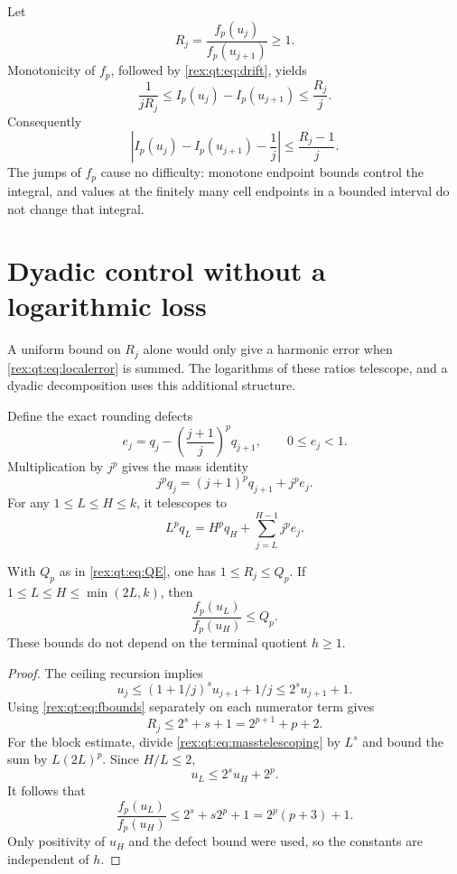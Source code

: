 Let
\begin{equation}\label{rex:qt:eq:R}
 R_j=\frac{f_p(u_j)}{f_p(u_{j+1})}\ge1.
\end{equation}
Monotonicity of $f_p$, followed by \eqref{rex:qt:eq:drift}, yields
\[
 \frac1{jR_j}\le I_p(u_j)-I_p(u_{j+1})\le\frac{R_j}{j}.
\]
Consequently
\begin{equation}\label{rex:qt:eq:localerror}
 \left|I_p(u_j)-I_p(u_{j+1})-\frac1j\right|
 \le\frac{R_j-1}{j}.
\end{equation}
The jumps of $f_p$ cause no difficulty: monotone endpoint bounds control the integral, and values at the finitely many cell endpoints in a bounded interval do not change that integral.

\section{Dyadic control without a logarithmic loss}\label{rex:qt:sec:dyadic}
A uniform bound on $R_j$ alone would only give a harmonic error when \eqref{rex:qt:eq:localerror} is summed. The logarithms of these ratios telescope, and a dyadic decomposition uses this additional structure.

Define the exact rounding defects
\begin{equation}\label{rex:qt:eq:defect}
 e_j=q_j-\left(\frac{j+1}{j}\right)^p q_{j+1},\qquad 0\le e_j<1.
\end{equation}
Multiplication by $j^p$ gives the mass identity
\begin{equation}\label{rex:qt:eq:massidentity}
 j^p q_j=(j+1)^p q_{j+1}+j^p e_j.
\end{equation}
For any $1\le L\le H\le k$, it telescopes to
\begin{equation}\label{rex:qt:eq:masstelescoping}
 L^p q_L=H^p q_H+\sum_{j=L}^{H-1}j^p e_j.
\end{equation}

\begin{lemma}\label{rex:qt:lem:ratios}
With $Q_p$ as in \eqref{rex:qt:eq:QE}, one has $1\le R_j\le Q_p$. If $1\le L\le H\le\min(2L,k)$, then
\begin{equation}\label{rex:qt:eq:blockratio}
 \frac{f_p(u_L)}{f_p(u_H)}\le Q_p.
\end{equation}
These bounds do not depend on the terminal quotient $h\ge1$.
\end{lemma}
\begin{proof}
The ceiling recursion implies
\[
 u_j\le (1+1/j)^s u_{j+1}+1/j\le2^s u_{j+1}+1.
\]
Using \eqref{rex:qt:eq:fbounds} separately on each numerator term gives
\[
 R_j\le 2^s+s+1=2^{p+1}+p+2.
\]
For the block estimate, divide \eqref{rex:qt:eq:masstelescoping} by $L^s$ and bound the sum by $L(2L)^p$. Since $H/L\le2$,
\[
 u_L\le2^s u_H+2^p.
\]
It follows that
\[
 \frac{f_p(u_L)}{f_p(u_H)}
 \le 2^s+s2^p+1=2^p(p+3)+1.
\]
Only positivity of $u_H$ and the defect bound were used, so the constants are independent of $h$.
\end{proof}

